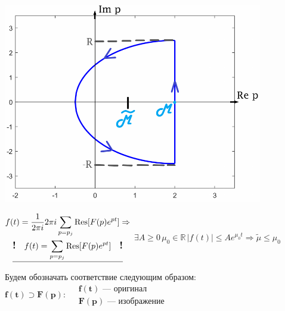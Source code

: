 	\begin{minipage}{0.5\textwidth}	
	
		 \newline
		\includegraphics[width=0.85\textwidth]{ch10/pict/analit_pict.png}
	\end{minipage}
	\hfill
	\begin{minipage}{0.4\textwidth}
		$
		\begin{gathered}
	 		f(t) =\dfrac{1}{2\pi i} 2\pi i \sum\limits_{p=p_j}\textrm{Res} [F(p)e^{pt}] \Rightarrow \\
	 		\underline{\textbf{\large!} \quad f(t) = \sum\limits_{p=p_j}\textrm{Res} [F(p)e^{pt}] \quad \textbf{\large!}}
		\end{gathered} \vspace{10mm}
		$
		\newline
		$\exists A \geqslant 0 \, \mu_0 \in \mathbb{R} \, |f(t)|\leqslant Ae^{\mu_0 t}\Rightarrow 
			\widetilde\mu \leqslant \mu_0$
	\end{minipage} \newline
	
	\begin{center}
		Будем обозначать соответствие следующим образом: 
			$\mathbf{f(t) \supset F(p)}: \quad 
				\begin{gathered}
					\mathbf{f(t)} \text{ --- оригинал} \\
					\mathbf{F(p)} \text{ --- изображение} 
				\end{gathered}
			$
	\end{center}
		
